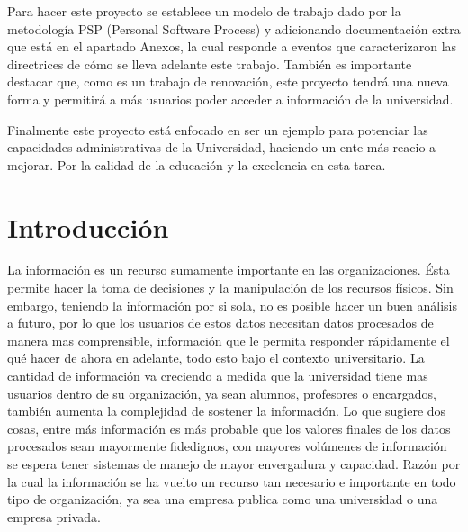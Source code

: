 \documentclass[a4paper,12pt,openany,oneside]{book}
\begin{document}
Para hacer este proyecto se establece un modelo de trabajo dado por la metodología PSP (Personal Software Process) y adicionando documentación extra que está en el apartado Anexos, la cual responde a eventos que caracterizaron las directrices de cómo se lleva adelante este trabajo. También es importante destacar que, como es un trabajo de renovación, este proyecto tendrá una nueva forma y permitirá a más usuarios poder acceder a información de la universidad.

Finalmente este proyecto está enfocado en ser un ejemplo para potenciar las capacidades administrativas de la Universidad, haciendo un ente más reacio a mejorar. Por la calidad de la educación y la excelencia en esta tarea.
\tableofcontents
\listoffigures
\chapter*{Introducción}
\thispagestyle{empty}
La información es un recurso sumamente importante en las organizaciones. Ésta permite hacer la toma de decisiones y la manipulación de los recursos físicos. Sin embargo, teniendo la información por si sola, no es posible hacer un buen análisis a futuro, por lo que los usuarios de estos datos necesitan datos procesados de manera mas comprensible, información que le permita responder rápidamente el qué hacer de ahora en adelante, todo esto bajo el contexto universitario. La cantidad de información va creciendo a medida que la universidad tiene mas usuarios dentro de su organización, ya sean alumnos, profesores o encargados, también aumenta la complejidad de sostener la información. Lo que sugiere dos cosas, entre más información es más probable que los valores finales de los datos procesados sean mayormente fidedignos, con mayores volúmenes de información se espera tener sistemas de manejo de mayor envergadura y capacidad. Razón por la cual la información se ha vuelto un recurso tan necesario e importante en todo tipo de organización, ya sea una empresa publica como una universidad o una empresa privada.
\end{document}
